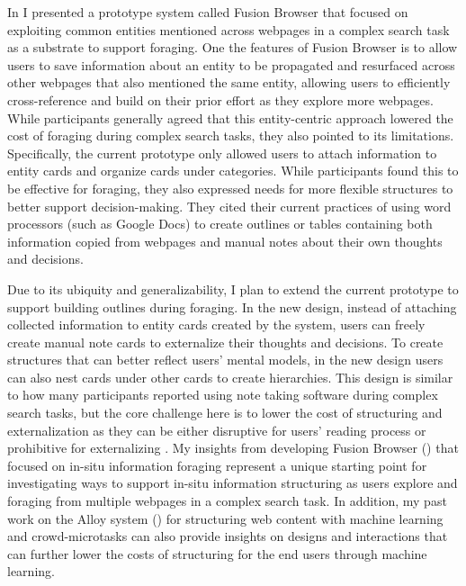 In  I presented a prototype system called Fusion Browser that focused on exploiting common entities mentioned across webpages in a complex search task as a substrate to support foraging. One the features of Fusion Browser is to allow users to save information about an entity to be propagated and resurfaced across other webpages that also mentioned the same entity, allowing users to efficiently cross-reference and build on their prior effort as they explore more webpages. While participants generally agreed that this entity-centric approach lowered the cost of foraging during complex search tasks, they also pointed to its limitations. Specifically, the current prototype only allowed users to attach information to entity cards and organize cards under categories. While participants found this to be effective for foraging, they also expressed needs for more flexible structures to better support decision-making. They cited their current practices of using word processors (such as Google Docs) to create outlines or tables containing both information copied from webpages and manual notes about their own thoughts and decisions.

Due to its ubiquity and generalizability, I plan to extend the current prototype to support building outlines during foraging. In the new design, instead of attaching collected information to entity cards created by the system, users can freely create manual note cards to externalize their thoughts and decisions. To create structures that can better reflect users' mental models, in the new design users can also nest cards under other cards to create hierarchies. This design is similar to how many participants reported using note taking software during complex search tasks, but the core challenge here is to lower the cost of structuring and externalization as they can be either disruptive for users' reading process or prohibitive for externalizing \cite{o1996towards,marshall1999introducing,tashman2011liquidtext,bianchi2015designing}. My insights from developing Fusion Browser () that focused on in-situ information foraging represent a unique starting point for investigating ways to support in-situ information structuring as users explore and foraging from multiple webpages in a complex search task. In addition, my past work on the Alloy system () for structuring web content with machine learning and crowd-microtasks can also provide insights on designs and interactions that can further lower the costs of structuring for the end users through machine learning.

